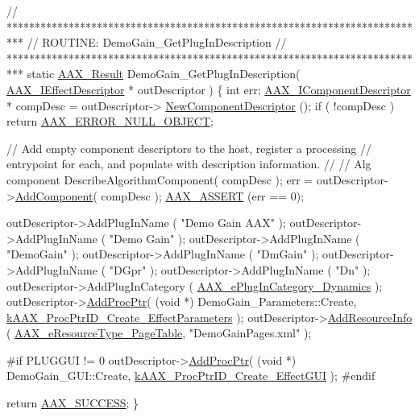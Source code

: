 \begin{DoxyCode}
\textcolor{comment}{// ***************************************************************************}
\textcolor{comment}{// ROUTINE: DemoGain\_GetPlugInDescription}
\textcolor{comment}{// ***************************************************************************}
\textcolor{keyword}{static} \hyperlink{a00149_a4d8f69a697df7f70c3a8e9b8ee130d2f}{AAX\_Result} DemoGain\_GetPlugInDescription( \hyperlink{a00096}{AAX\_IEffectDescriptor} * 
      outDescriptor )
\{
    \textcolor{keywordtype}{int}                         err;
    \hyperlink{a00088}{AAX\_IComponentDescriptor} *  compDesc = outDescriptor->
      \hyperlink{a00096_a2102ea4391f5b60e4d5e860a997383e4}{NewComponentDescriptor} ();
    \textcolor{keywordflow}{if} ( !compDesc )
        \textcolor{keywordflow}{return} \hyperlink{a00207_a5f8c7439f3a706c4f8315a9609811937a647cce13fa531e3a46c6eab694048a9c}{AAX\_ERROR\_NULL\_OBJECT};

    \textcolor{comment}{// Add empty component descriptors to the host, register a processing}
    \textcolor{comment}{// entrypoint for each, and populate with description information. }
    \textcolor{comment}{//}
    \textcolor{comment}{// Alg component}
    DescribeAlgorithmComponent( compDesc );
    err = outDescriptor->\hyperlink{a00096_aec33938f50461dd5e7c1dcc25faf6917}{AddComponent}( compDesc ); \hyperlink{a00158_a168ee44fd7a5485ab50160db36fb2988}{AAX\_ASSERT} (err == 0);

    outDescriptor->AddPlugInName ( \textcolor{stringliteral}{"Demo Gain AAX"} );
    outDescriptor->AddPlugInName ( \textcolor{stringliteral}{"Demo Gain"} );
    outDescriptor->AddPlugInName ( \textcolor{stringliteral}{"DemoGain"} );
    outDescriptor->AddPlugInName ( \textcolor{stringliteral}{"DmGain"} );
    outDescriptor->AddPlugInName ( \textcolor{stringliteral}{"DGpr"} );
    outDescriptor->AddPlugInName ( \textcolor{stringliteral}{"Dn"} );
    outDescriptor->AddPlugInCategory ( \hyperlink{a00206_aef9637518fb1ac0e2f403444c73aba4aa1e8d5202983c58aa0346a9a547f55bd9}{AAX\_ePlugInCategory\_Dynamics} );
    outDescriptor->\hyperlink{a00096_ad1a286ef7cb869e6f79423dd774ec976}{AddProcPtr}( (\textcolor{keywordtype}{void} *) DemoGain\_Parameters::Create, 
      \hyperlink{a00163_af0682195d377392ad356fd2b00c36892a86aab4af036f1087b4f31bbac234ac3d}{kAAX\_ProcPtrID\_Create\_EffectParameters} );
    outDescriptor->\hyperlink{a00096_a3326bd8e29690a352408539029a50a61}{AddResourceInfo} ( \hyperlink{a00206_ae2805e88175d975589153a04e42898bbab0028d7fb45564dc4afa0f0a50296043}{AAX\_eResourceType\_PageTable},
       \textcolor{stringliteral}{"DemoGainPages.xml"} );

\textcolor{preprocessor}{#if PLUGGUI != 0}
    outDescriptor->\hyperlink{a00096_ad1a286ef7cb869e6f79423dd774ec976}{AddProcPtr}( (\textcolor{keywordtype}{void} *) DemoGain\_GUI::Create, 
      \hyperlink{a00163_af0682195d377392ad356fd2b00c36892a102df0cf99f7423a7997dd283eed7a88}{kAAX\_ProcPtrID\_Create\_EffectGUI} );
\textcolor{preprocessor}{#endif}

    \textcolor{keywordflow}{return} \hyperlink{a00207_a5f8c7439f3a706c4f8315a9609811937aeddbd1bb67e3a66e6af54a4b4a7a57b3}{AAX\_SUCCESS};
\}
\end{DoxyCode}
